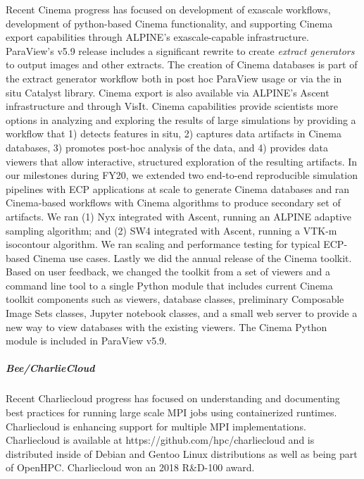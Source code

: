 Recent Cinema progress has focused on development of exascale workflows, development of python-based Cinema functionality, and supporting Cinema export capabilities through ALPINE's exascale-capable infrastructure.  ParaView's v5.9 release includes a significant rewrite to create \textit{extract generators} to output images and other extracts.  The creation of Cinema databases is part of the extract generator workflow both in post hoc ParaView usage or via the in situ Catalyst library.  Cinema export is also available via ALPINE's Ascent infrastructure and through VisIt.    
Cinema capabilities provide scientists more options in analyzing and exploring the results of large simulations by providing a workflow that 1) detects features in situ, 2) captures data artifacts in Cinema databases, 3) promotes post-hoc analysis of the data, and 4) provides data viewers that allow interactive, structured exploration of the resulting artifacts. 
%
In our milestones during FY20, we extended two end-to-end reproducible simulation pipelines with ECP applications at scale to generate Cinema databases and ran Cinema-based workflows with Cinema algorithms to produce secondary set of artifacts.  We ran (1) Nyx integrated with Ascent, running an ALPINE adaptive sampling algorithm; and (2) SW4 integrated with Ascent, running a VTK-m isocontour algorithm.   We ran scaling and performance testing for typical ECP-based Cinema use cases.  Lastly we did the annual release of the Cinema toolkit.  Based on user feedback, we  changed the toolkit from a set of viewers and a command line tool to a single Python module that includes current Cinema toolkit components such as viewers, database classes, preliminary Composable Image Sets classes, Jupyter notebook classes, and a small web server to provide a new way to view databases with the existing viewers.  The Cinema Python module is included in ParaView v5.9.



\subparagraph{Bee/CharlieCloud}
%
Recent Charliecloud progress has focused on understanding and documenting best
practices for running large scale MPI jobs using containerized runtimes.
Charliecloud is enhancing support for multiple MPI implementations.
Charliecloud is available at https://github.com/hpc/charliecloud and is
distributed inside of Debian and Gentoo Linux distributions as well as being
part of OpenHPC.  Charliecloud won an 2018 R\&D-100 award.

